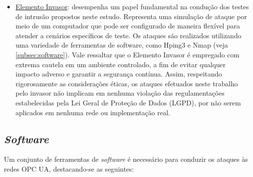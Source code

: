 \begin{itemize}
            \item \underline{Elemento Invasor}: desempenha um papel fundamental na condução dos testes de intrusão propostos neste estudo. Representa uma simulação de ataque por meio de um computador que pode ser configurado de maneira flexível para atender a cenários específicos de teste. Os ataques são realizados utilizando uma variedade de ferramentas de software, como Hping3 e Nmap (veja \autoref{subsec:software}). Vale ressaltar que o Elemento Invasor é empregado com extrema cautela em um ambiente controlado, a fim de evitar qualquer impacto adverso e garantir a segurança contínua. Assim, respeitando rigorosamente as considerações éticas, os ataques efetuados neste trabalho pelo invasor não implicam em nenhuma violação das regulamentações estabelecidas pela Lei Geral de Proteção de Dados (LGPD), por não serem aplicados em nenhuma rede ou implementação real.
        \end{itemize}
    
    \subsection{\textit{Software}} \label{subsec:software}

        Um conjunto de ferramentas de \textit{software} é necessário para conduzir os ataques às redes OPC UA, destacando-se as seguintes:

